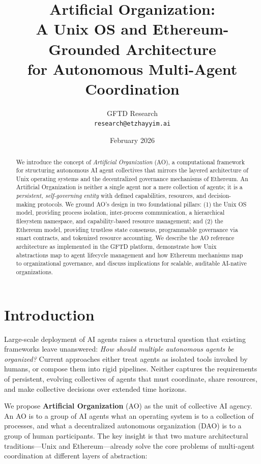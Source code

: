 \documentclass[11pt,a4paper]{article}
\title{Artificial Organization: \\ A Unix OS and Ethereum-Grounded Architecture \\ for Autonomous Multi-Agent Coordination}
\author{
  GFTD Research \\
  \texttt{research@etzhayyim.ai}
}
\date{February 2026}
\begin{document}
\maketitle

\begin{abstract}
We introduce the concept of \emph{Artificial Organization} (AO), a computational
framework for structuring autonomous AI agent collectives that mirrors the
layered architecture of Unix operating systems and the decentralized governance
mechanisms of Ethereum. An Artificial Organization is neither a single agent nor
a mere collection of agents; it is a \emph{persistent, self-governing entity}
with defined capabilities, resources, and decision-making protocols. We ground
AO's design in two foundational pillars: (1) the Unix OS model, providing
process isolation, inter-process communication, a hierarchical filesystem
namespace, and capability-based resource management; and (2) the Ethereum
model, providing trustless state consensus, programmable governance via smart
contracts, and tokenized resource accounting. We describe the AO reference
architecture as implemented in the GFTD platform, demonstrate how Unix
abstractions map to agent lifecycle management and how Ethereum mechanisms map
to organizational governance, and discuss implications for scalable, auditable
AI-native organizations.
\end{abstract}

\section{Introduction}

Large-scale deployment of AI agents raises a structural question that existing
frameworks leave unanswered: \emph{How should multiple autonomous agents be
organized?} Current approaches either treat agents as isolated tools invoked by
humans, or compose them into rigid pipelines. Neither captures the requirements
of persistent, evolving collectives of agents that must coordinate, share
resources, and make collective decisions over extended time horizons.

We propose \textbf{Artificial Organization} (AO) as the unit of collective AI
agency. An AO is to a group of AI agents what an operating system is to a
collection of processes, and what a decentralized autonomous organization (DAO)
is to a group of human participants. The key insight is that two mature
architectural traditions---Unix and Ethereum---already solve the core problems
of multi-agent coordination at different layers of abstraction:
\end{document}
